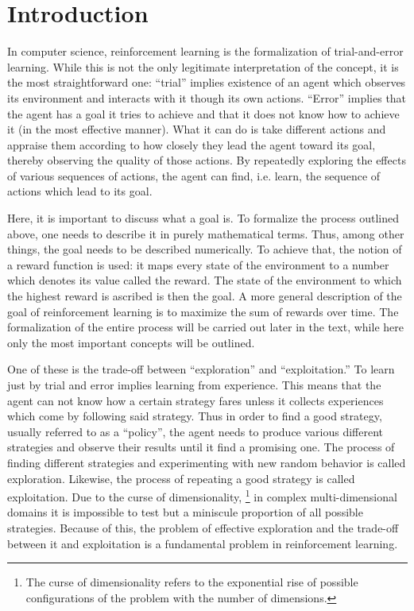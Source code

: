 \chapter{Introduction}

In computer science, reinforcement learning is the formalization of trial-and-error learning.
While this is not the only legitimate interpretation of the concept, it is the most straightforward one:
``trial'' implies existence of an agent which observes its environment and interacts with it 
though its own actions.
``Error'' implies that the agent has a goal it tries to achieve and
that it does not know how to achieve it (in the most effective manner). 
What it can do is take different actions and appraise them
according to how closely they lead the agent toward its goal, thereby observing
the quality of those actions.
By repeatedly exploring the effects of various sequences of actions, the agent
can find, i.e. learn, the sequence of actions which lead to its goal.

Here, it is important to discuss what a goal is.
To formalize the process outlined above, one needs to describe it
in purely mathematical terms.
Thus, among other things, the goal needs to be described numerically.
To achieve that, the notion of a reward function is used:
it maps every state of the environment to a number which denotes
its value called the reward. 
The state of the environment to which the highest reward is ascribed
is then the goal.
A more general description of the goal of reinforcement learning
is to maximize the sum of rewards over time.
The formalization of the entire process will be carried out later in the text,
while here only the most important concepts will be outlined.

One of these is the trade-off between ``exploration''
and ``exploitation.''
To learn just by trial and error implies learning from experience.
This means that the agent can not know 
how a certain strategy fares unless it collects experiences 
which come by following said strategy.
Thus in order to find a good strategy,
usually referred to as a ``policy'',
the agent needs to produce various different strategies and observe their results
until it find a promising one.
The process of finding different strategies and experimenting with new random
behavior is called exploration.
Likewise, the process of repeating a good strategy is called exploitation.
Due to the curse of dimensionality, 
\footnote{The curse of dimensionality refers to the exponential rise of 
possible configurations of the problem with the number of dimensions.}
in complex multi-dimensional domains it is impossible to test but a miniscule proportion 
of all possible strategies.
Because of this, the problem of effective exploration and the trade-off between
it and exploitation is a fundamental problem in reinforcement learning.

